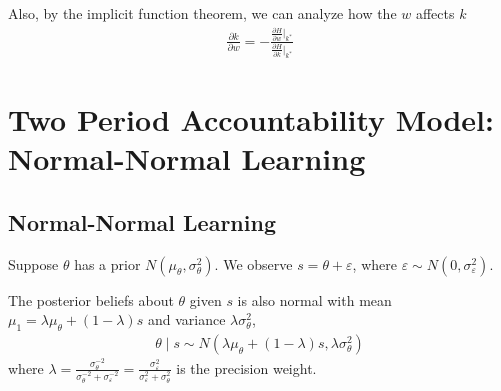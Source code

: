 \documentclass[11pt]{elegantbook}
\begin{document}
Also, by the implicit function theorem, we can analyze how the $w$ affects $k$
\begin{equation}
    \begin{aligned}
        \frac{\partial k}{\partial w}=-\frac{\frac{\partial H}{\partial w}\big|_{k^*}}{\frac{\partial H}{\partial k}\big|_{k^*}}
    \end{aligned}
    \nonumber
\end{equation}


\section{Two Period Accountability Model: Normal-Normal Learning}
\subsection{Normal-Normal Learning}
Suppose $\theta$ has a prior $N(\mu_\theta,\sigma_\theta^2)$. We observe $s=\theta+\varepsilon$, where $\varepsilon\sim N(0,\sigma_\varepsilon^2)$.
\begin{proposition}\label{NNL}
    The posterior beliefs about $\theta$ given $s$ is also normal with mean $\mu_1=\lambda\mu_\theta+(1-\lambda)s$ and variance $\lambda\sigma_\theta^2$,
    \begin{equation}
        \begin{aligned}
            \theta\mid s\sim N(\lambda\mu_\theta+(1-\lambda)s,\lambda\sigma_\theta^2)
        \end{aligned}
        \nonumber
    \end{equation}
    where $\lambda=\frac{\sigma_\theta^{-2}}{\sigma_\theta^{-2}+\sigma_\varepsilon^{-2}}=\frac{\sigma_\varepsilon^{2}}{\sigma_\varepsilon^{2}+\sigma_\theta^{2}}$ is the precision weight.
\end{proposition}
\end{document}

